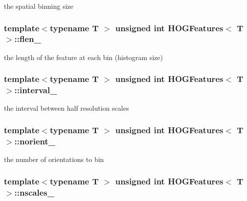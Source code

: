the spatial binning size 

\hypertarget{classHOGFeatures_ae895d79d7725afb35846cd3e08be6b74}{
\subsubsection[{flen\-\_\-}]{\setlength{\rightskip}{0pt plus 5cm}template$<$typename T $>$ unsigned int {\bf H\-O\-G\-Features}$<$ T $>$\-::flen\-\_\-\hspace{0.3cm}{\ttfamily [private]}}}\label{classHOGFeatures_ae895d79d7725afb35846cd3e08be6b74}


the length of the feature at each bin (histogram size) 

\hypertarget{classHOGFeatures_a5e73ec994a2f8cae1b466bad5a9cb2a3}{
\subsubsection[{interval\-\_\-}]{\setlength{\rightskip}{0pt plus 5cm}template$<$typename T $>$ unsigned int {\bf H\-O\-G\-Features}$<$ T $>$\-::interval\-\_\-\hspace{0.3cm}{\ttfamily [private]}}}\label{classHOGFeatures_a5e73ec994a2f8cae1b466bad5a9cb2a3}


the interval between half resolution scales 

\hypertarget{classHOGFeatures_a549b2c1d78c2fcabe8d2692f7f466687}{
\subsubsection[{norient\-\_\-}]{\setlength{\rightskip}{0pt plus 5cm}template$<$typename T $>$ unsigned int {\bf H\-O\-G\-Features}$<$ T $>$\-::norient\-\_\-\hspace{0.3cm}{\ttfamily [private]}}}\label{classHOGFeatures_a549b2c1d78c2fcabe8d2692f7f466687}


the number of orientations to bin 

\hypertarget{classHOGFeatures_a503011deedc5ff736fa135149a2919f9}{
\subsubsection[{nscales\-\_\-}]{\setlength{\rightskip}{0pt plus 5cm}template$<$typename T $>$ unsigned int {\bf H\-O\-G\-Features}$<$ T $>$\-::nscales\-\_\-\hspace{0.3cm}{\ttfamily [private]}}}\label{classHOGFeatures_a503011deedc5ff736fa135149a2919f9}


